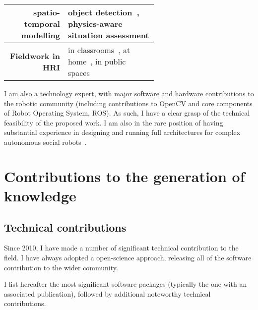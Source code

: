 \begin{table}[h!]
\begin{tabular}{rp{0.6\linewidth}}
        spatio-temporal modelling & \small object
        detection~\cite{wallbridge2017qualitative}, physics-aware situation
        assessment\cite{lemaignan2018underworlds,sallami2019simulation} \\
        \midrule
        \textbf{Fieldwork in HRI} & \small in
        classrooms~\cite{hood2015when, lemaignan2016learning, jacq2016building,
        baxter2015wider,kennedy2016cautious,senft2018robots}, at
        home~\cite{mondada2015ranger}, in public spaces~\cite{winkle2020insitu}\\
        \bottomrule
    \end{tabular}
    \label{pi-expertise}
\end{table}

I am also a technology expert, with major software and hardware contributions to
the robotic community (including contributions to OpenCV and core components of
Robot Operating System, ROS). As such, I have a clear grasp of the technical
feasibility of the proposed work. I am also in the rare position of having
substantial experience in designing and running full architectures for complex
autonomous social
robots~\cite{lemaignan2017artificial,winkle2020insitu}.


\section{Contributions to the generation of knowledge}

\subsection{Technical contributions}

Since 2010, I have made a number of significant technical contribution to the
field. I have always adopted a open-science approach, releasing all of the
software contribution to the wider community.

I list hereafter the most significant software packages (typically the one with an
associated publication), followed by additional noteworthy technical
contributions.

